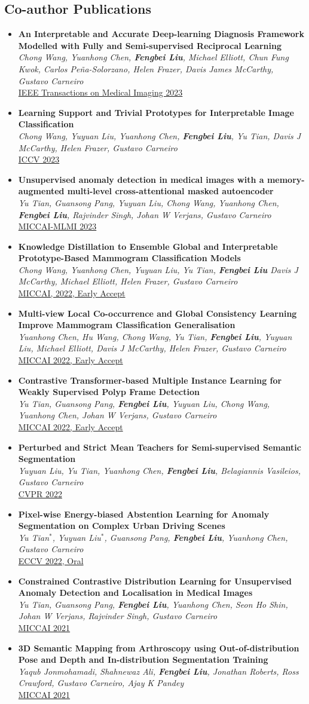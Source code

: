 \documentclass[letterpaper,11pt]{article}
\newcommand{\resumePubheading}[3]{
  \vspace{-2pt} \item\small{
    {\textbf{#1} \vspace{-2pt}}\\
    {\textit{\small#2}}\\ 
    \underline{\small#3}
  }
}
\newcommand{\resumeSubHeadingListStart}{\begin{itemize}[leftmargin=0.15in, label={}]}
\newcommand{\resumeSubHeadingListEnd}{\end{itemize}}
\begin{document}
  \subsection*{Co-author Publications}
  \resumeSubHeadingListStart
    \resumePubheading{An Interpretable and Accurate Deep-learning Diagnosis Framework Modelled with Fully and Semi-supervised Reciprocal Learning}{Chong Wang, Yuanhong Chen, \textbf{Fengbei Liu}, Michael Elliott, Chun Fung Kwok, Carlos Peña-Solorzano, Helen Frazer, Davis James McCarthy, Gustavo Carneiro}{IEEE Transactions on Medical Imaging 2023}
    \resumePubheading{Learning Support and Trivial Prototypes for Interpretable Image Classification}{Chong Wang, Yuyuan Liu, Yuanhong Chen, \textbf{Fengbei Liu}, Yu Tian, Davis J McCarthy, Helen Frazer, Gustavo Carneiro}{ICCV 2023}
    \resumePubheading{Unsupervised anomaly detection in medical images with a memory-augmented multi-level cross-attentional masked autoencoder}{Yu Tian, Guansong Pang, Yuyuan Liu, Chong Wang, Yuanhong Chen, \textbf{Fengbei Liu}, Rajvinder Singh, Johan W Verjans, Gustavo Carneiro}{MICCAI-MLMI 2023}
    \resumePubheading{Knowledge Distillation to Ensemble Global and Interpretable Prototype-Based Mammogram Classification Models}{Chong Wang, Yuanhong Chen, Yuyuan Liu, Yu Tian, \textbf{Fengbei Liu} Davis J McCarthy, Michael Elliott, Helen Frazer, Gustavo Carneiro}{MICCAI, 2022, Early Accept}
    \resumePubheading{Multi-view Local Co-occurrence and Global Consistency Learning Improve Mammogram Classification Generalisation}{Yuanhong Chen, Hu Wang, Chong Wang, Yu Tian, \textbf{Fengbei Liu}, Yuyuan Liu, Michael Elliott, Davis J McCarthy, Helen Frazer, Gustavo Carneiro}{MICCAI 2022, Early Accept}
    \resumePubheading{Contrastive Transformer-based Multiple Instance Learning for Weakly Supervised Polyp Frame Detection}{Yu Tian, Guansong Pang, \textbf{Fengbei Liu}, Yuyuan Liu, Chong Wang, Yuanhong Chen, Johan W Verjans, Gustavo Carneiro}{MICCAI 2022, Early Accept}
    \resumePubheading{Perturbed and Strict Mean Teachers for Semi-supervised Semantic Segmentation}{Yuyuan Liu, Yu Tian, Yuanhong Chen, \textbf{Fengbei Liu}, Belagiannis Vasileios, Gustavo Carneiro}{CVPR 2022}
    \resumePubheading{Pixel-wise Energy-biased Abstention Learning for Anomaly Segmentation on Complex Urban Driving Scenes}{Yu Tian$^*$, Yuyuan Liu$^*$, Guansong Pang, \textbf{Fengbei Liu}, Yuanhong Chen, Gustavo Carneiro}{ECCV 2022, Oral}
    \resumePubheading{Constrained Contrastive Distribution Learning for Unsupervised Anomaly Detection and Localisation in Medical Images}{Yu Tian, Guansong Pang, \textbf{Fengbei Liu}, Yuanhong Chen, Seon Ho Shin, Johan W Verjans, Rajvinder Singh, Gustavo Carneiro}{MICCAI 2021}
    \resumePubheading{3D Semantic Mapping from Arthroscopy using Out-of-distribution Pose and Depth and In-distribution Segmentation Training}{Yaqub Jonmohamadi, Shahnewaz Ali, \textbf{Fengbei Liu}, Jonathan Roberts, Ross Crawford, Gustavo Carneiro, Ajay K Pandey}{MICCAI 2021}
  \resumeSubHeadingListEnd
\end{document}
